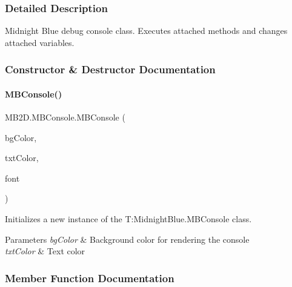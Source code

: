 \subsubsection{Detailed Description}
Midnight Blue debug console class. Executes attached methods and changes attached variables. 



\subsubsection{Constructor \& Destructor Documentation}
\hypertarget{class_m_b2_d_1_1_m_b_console_a9d251b5f9babfcb08cc519d707c9b815}{}\label{class_m_b2_d_1_1_m_b_console_a9d251b5f9babfcb08cc519d707c9b815} 
\paragraph{\texorpdfstring{M\+B\+Console()}{MBConsole()}}
{\footnotesize\ttfamily M\+B2\+D.\+M\+B\+Console.\+M\+B\+Console (\begin{DoxyParamCaption}\item[{Color}]{bg\+Color,  }\item[{Color}]{txt\+Color,  }\item[{Sprite\+Font}]{font }\end{DoxyParamCaption})\hspace{0.3cm}{\ttfamily [inline]}}



Initializes a new instance of the T\+:\+Midnight\+Blue.\+M\+B\+Console class. 


\begin{DoxyParams}{Parameters}
{\em bg\+Color} & Background color for rendering the console\\
\hline
{\em txt\+Color} & Text color\\
\hline
\end{DoxyParams}


\subsubsection{Member Function Documentation}
\hypertarget{class_m_b2_d_1_1_m_b_console_a3c515ad4a199b0b67049df57fce7cb3f}{}\label{class_m_b2_d_1_1_m_b_console_a3c515ad4a199b0b67049df57fce7cb3f} 
